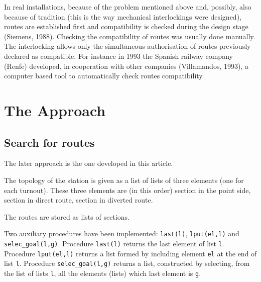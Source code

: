 \documentclass{article}
\begin{document}
In real installations, because of the problem mentioned above and, possibly, also 
because of tradition (this is the way mechanical interlockings were designed), routes 
are established first and compatibility is checked during the design stage (Siemens, 
1988). Checking the compatibility of routes was usually done manually. The 
interlocking allows only the simultaneous authorisation of routes previously 
declared as compatible. For instance in 1993 the Spanish railway company (Renfe) 
developed, in cooperation with other companies (Villamandos, 1993), a computer based 
tool to automatically check routes compatibility.

\section{The Approach}

\subsection{Search for routes}

The later approach is the one developed in this article. 

The topology of the station is given as a list of lists of three elements 
(one for each turnout).
These three elements are (in this order) section in the point side, 
section in direct route, section in diverted route.

The routes are stored as lists of sections.

Two auxiliary procedures have been implemented: {\tt last(l)}, {\tt lput(el,l)} 
and {\tt selec\_goal(l,g)}.
Procedure {\tt last(l)} returns the last element of list {\tt l}.
Procedure {\tt lput(el,l)} returns a list formed by including element {\tt el} at the 
end of list {\tt l}.
Procedure {\tt selec\_goal(l,g)} returns a list, constructed by selecting, from the list 
of lists {\tt l}, all the elements (lists) which last element is {\tt g}.
\end{document}
